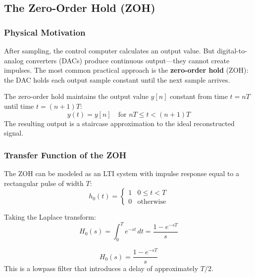 \subsection{The Zero-Order Hold (ZOH)}
\label{subsec:zoh}

\subsubsection{Physical Motivation}

After sampling, the control computer calculates an output value. But digital-to-analog converters (DACs) produce continuous output---they cannot create impulses. The most common practical approach is the \textbf{zero-order hold} (ZOH): the DAC holds each output sample constant until the next sample arrives.

\begin{definition}
The zero-order hold maintains the output value $y[n]$ constant from time $t = nT$ until time $t = (n+1)T$:
\begin{equation}
y(t) = y[n] \quad \text{for } nT \leq t < (n+1)T
\label{eq:zoh_definition}
\end{equation}
The resulting output is a staircase approximation to the ideal reconstructed signal.
\end{definition}

\subsubsection{Transfer Function of the ZOH}

The ZOH can be modeled as an LTI system with impulse response equal to a rectangular pulse of width $T$:
\begin{equation}
h_0(t) = \begin{cases}
1 & 0 \leq t < T \\
0 & \text{otherwise}
\end{cases}
\label{eq:zoh_impulse}
\end{equation}

Taking the Laplace transform:
\begin{equation}
H_0(s) = \int_0^T e^{-st} \, dt = \frac{1 - e^{-sT}}{s}
\label{eq:zoh_transfer}
\end{equation}

\begin{tcolorbox}[colback=green!5!white,colframe=green!75!black,sharp corners,title=Zero-Order Hold Transfer Function]
\begin{equation}
H_0(s) = \frac{1 - e^{-sT}}{s}
\label{eq:zoh_tf_boxed}
\end{equation}
This is a lowpass filter that introduces a delay of approximately $T/2$.
\end{tcolorbox}

